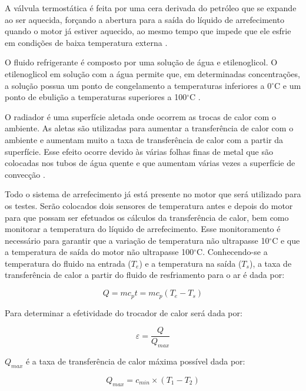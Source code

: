 A válvula termostática é feita por uma cera derivada do petróleo que se expande ao ser aquecida, forçando a abertura para a saída do líquido de arrefecimento quando o motor já estiver aquecido, ao mesmo tempo que impede que ele esfrie em condições de baixa temperatura externa \cite{energiaToyota}.  

O fluido refrigerante é composto por uma solução de água e etilenoglicol. O etilenoglicol em solução com a água permite que, em determinadas concentrações, a solução possua um ponto de congelamento a temperaturas inferiores a 0$^{\circ}$C e um ponto de ebulição a temperaturas superiores a 100$^{\circ}$C \cite{energiaToyota}. %

O radiador é uma superfície aletada onde ocorrem as trocas de calor com o ambiente. As aletas são utilizadas para aumentar a transferência de calor com o ambiente e aumentam muito a taxa de transferência de calor com a partir da superfície.  Esse efeito ocorre devido às várias folhas finas de metal que são colocadas nos tubos de água quente e que aumentam várias vezes a superfície de convecção \cite{energiaTransferencia}.

Todo o sistema de arrefecimento já está presente no motor que será utilizado para os testes. Serão colocados dois sensores de temperatura antes e depois do motor para que possam ser efetuados os cálculos da transferência de calor, bem como monitorar a temperatura do líquido de arrefecimento. Esse monitoramento é necessário para garantir que a  variação de temperatura não ultrapasse 10$^{\circ}$C e que a temperatura de saída do motor não ultrapasse 100$^{\circ}$C.  Conhecendo-se a temperatura do fluido na entrada ($T_{e}$) e a temperatura na saída ($T_{s}$), a taxa de transferência de calor a partir do fluido de resfriamento para o ar é dada por:

\begin{equation}
	Q = mc_{p}t = mc_{p}(T_{e} - T_{s})
\end{equation}

Para determinar a efetividade do trocador de calor será dada por:

\begin{equation}
	\varepsilon = \frac{Q}{Q_{max}}
\end{equation}

$Q_{max}$ é a taxa de transferência de calor máxima possível dada por:

\begin{equation}
	Q_{max} = c_{min} \times (T_{1} - T_{2})
\end{equation}

